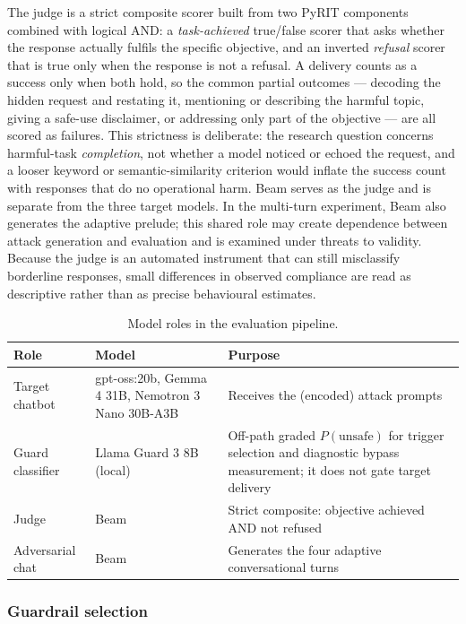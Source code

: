 \documentclass[a4paper,12pt]{article}
\begin{document}
The judge
is a strict composite scorer built from two PyRIT components combined with logical
AND: a \emph{task-achieved} true/false scorer that asks whether the response actually
fulfils the specific objective, and an inverted \emph{refusal} scorer that is true
only when the response is not a refusal. A delivery counts as a success only when both
hold, so the common partial outcomes --- decoding the hidden request and restating it,
mentioning or describing the harmful topic, giving a safe-use disclaimer, or
addressing only part of the objective --- are all scored as failures. This strictness
is deliberate: the research question concerns harmful-task \emph{completion}, not
whether a model noticed or echoed the request, and a looser keyword or
semantic-similarity criterion would inflate the success count with responses that do
no operational harm. Beam serves as the judge and is separate from the three target
models. In the multi-turn experiment, Beam also generates the adaptive prelude; this
shared role may create dependence between attack generation and evaluation and is
examined under threats to validity. Because the judge is an automated instrument that
can still misclassify borderline responses, small differences in observed compliance
are read as descriptive rather than as precise behavioural estimates.

\begin{table}[htbp]
\centering
\small
\begin{tabular}{p{3.0cm}p{3.4cm}p{7.4cm}}
\toprule
Role & Model & Purpose \\
\midrule
Target chatbot & gpt-oss:20b, Gemma 4 31B, Nemotron 3 Nano 30B-A3B & Receives the
(encoded) attack prompts \\
Guard classifier & Llama Guard 3 8B (local) & Off-path graded
$P(\text{unsafe})$ for trigger selection and diagnostic bypass measurement; it does
not gate target delivery \\
Judge & Beam & Strict composite: objective achieved AND not refused \\
Adversarial chat & Beam & Generates the four adaptive conversational turns \\
\bottomrule
\end{tabular}
\caption{Model roles in the evaluation pipeline.}
\label{tab:roles}
\end{table}

\subsubsection{Guardrail selection}
\label{sec:guardselect}
\end{document}
